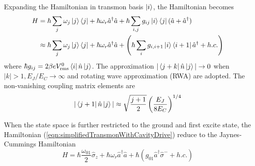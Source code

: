             Expanding the Hamiltonian in transmon basis $ \ket{i} $, the Hamiltonian becomes
            \begin{align}
            \label{eqn:transmonWithCavityDriveExpanded}
                H &= \hbar \sum_j \omega_j \ket j \bra j + \hbar \omega_r \hat a^\dagger \hat a + \hbar \sum_{i,j} g_{ij} \ket i \bra j (\hat a + \hat a^\dagger ) \\
                \label{eqn:simplifiedTransmonWithCavityDrive}
                & \approx \hbar \sum_j \omega_j \ket j \bra j + \hbar \omega_r \hat a^\dagger \hat a  + \left (\hbar \sum_{i} g_{i,i+1} \ket i \bra{i+1} \hat a^\dagger + h.c. \right )
            \end{align}
            where $\hbar g_{ij} = 2 \beta e V^0_{\text{rms}} \bra i \hat n \ket j$. The approximation $ |\bra{j+k}\hat n \ket j| \rightarrow 0  $ when $|k|>1, E_J/E_C \rightarrow \infty $ and rotating wave approximation (RWA) are adopted. The non-vanishing coupling matrix elements are
            \begin{equation}
            \label{eqn:couplingElements}
                | \bra{j+1} \hat n \ket j |\approx \sqrt{ \frac{j+1}{2}} \left ( \frac{E_J}{8E_C} \right )^{1/4} 
            \end{equation}

            When the state space is further restricted to the ground and first excite state, the Hamiltonian (\ref{eqn:simplifiedTransmonWithCavityDrive}) reduce to the Jaynes-Cummings Hamiltonian\cite{walls2007quantum,schuster2007circuit}
            \begin{equation}
                H = \hbar \frac{\omega_{01}}{2} \hat \sigma_z + \hbar \omega_r \hat a^\dagger \hat a  + \hbar (g_{01}\hat a^\dagger \hat \sigma^- + h.c. )
            \end{equation}
            
